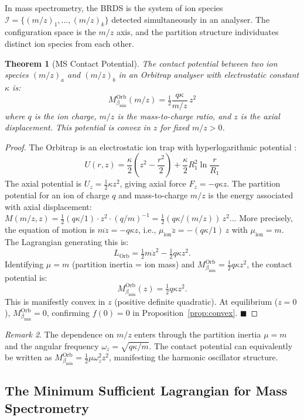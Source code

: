\documentclass[12pt, a4paper]{article}
\theoremstyle{plain}
\newtheorem{theorem}{Theorem}[section]
\theoremstyle{definition}
\theoremstyle{remark}
\newtheorem{remark}[theorem]{Remark}
\newcommand{\bmin}{\beta_{\min}}
\newcommand{\Ical}{\mathcal{I}}
\newcommand{\half}{\tfrac{1}{2}}
\newcommand{\qed}{\hfill$\blacksquare$}
\begin{document}
In mass spectrometry, the BRDS is the system of ion species $\Ical = \{(m/z)_1,
\ldots, (m/z)_k\}$ detected simultaneously in an analyser. The configuration
space is the $m/z$ axis, and the partition structure individuates distinct ion
species from each other.

\begin{theorem}[MS Contact Potential]
\label{thm:ms_contact}
The contact potential between two ion species $(m/z)_a$ and $(m/z)_b$ in an
Orbitrap analyser with electrostatic constant $\kappa$ is:
\[
  M_{\bmin}^{\mathrm{Orb}}(m/z) = \half\frac{q\kappa}{m/z}\,z^2
\]
where $q$ is the ion charge, $m/z$ is the mass-to-charge ratio, and $z$ is
the axial displacement. This potential is convex in $z$ for fixed $m/z > 0$.
\end{theorem}

\begin{proof}
The Orbitrap is an electrostatic ion trap with hyperlogarithmic potential
\citep{makarov2000performance}:
\[
  U(r, z) = \frac{\kappa}{2}\left(z^2 - \frac{r^2}{2}\right) + \frac{\kappa}{2}R_1^2\ln\frac{r}{R_1}
\]
The axial potential is $U_z = \half\kappa z^2$, giving axial force $F_z = -q\kappa z$.
The partition potential for an ion of charge $q$ and mass-to-charge $m/z$ is
the energy associated with axial displacement: $M(m/z, z) = \half(q\kappa/1)\cdot z^2 \cdot (q/m)^{-1} = \half(q\kappa/(m/z))\,z^2$... More precisely, the equation of motion is $m\ddot{z} = -q\kappa z$, i.e., $\mu_{\mathrm{ion}}\ddot{z} = -(q\kappa/1)\,z$ with $\mu_{\mathrm{ion}} = m$. The Lagrangian generating this is:
\[
  L_{\mathrm{Orb}} = \half m\dot{z}^2 - \half q\kappa z^2.
\]
Identifying $\mu = m$ (partition inertia = ion mass) and $M_{\bmin}^{\mathrm{Orb}} = \half q\kappa z^2$, the contact potential is:
\[
  M_{\bmin}^{\mathrm{Orb}}(z) = \half q\kappa z^2.
\]
This is manifestly convex in $z$ (positive definite quadratic). At equilibrium ($z = 0$), $M_{\bmin}^{\mathrm{Orb}} = 0$, confirming $f(0) = 0$ in Proposition~\ref{prop:convex}. \qed
\end{proof}

\begin{remark}
The dependence on $m/z$ enters through the partition inertia $\mu = m$ and the angular frequency $\omega_z = \sqrt{q\kappa/m}$. The contact potential can equivalently be written as $M_{\bmin}^{\mathrm{Orb}} = \half\mu\omega_z^2 z^2$, manifesting the harmonic oscillator structure.
\end{remark}

\subsection{The Minimum Sufficient Lagrangian for Mass Spectrometry}
\end{document}
